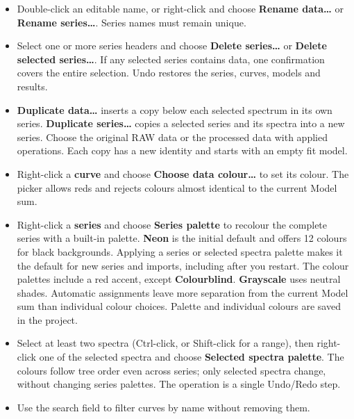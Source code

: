\documentclass[
  10pt,
  a4paper,
  oneside]{scrreprt}
\begin{document}
\begin{itemize}
  Waterfall displays. The equally sized coloured square beside the
  checkbox shows that spectrum's current colour (a native tree icon,
  beside the checkbox). Click the colour square to open the spectrum
  colour picker directly; this is separate from the visibility checkbox
  and supports Undo/Redo. The square also updates when colours or
  palettes change. Hover over the checkbox for an explanation. Hiding a
  spectrum retains its data and fit; hidden spectra are excluded from
  fit plans. Highlighting rows separately selects spectra for
  operations. Hidden spectrum names appear muted; Up/Down navigation
  skips them. Click a hidden spectrum to inspect it, or check its
  visibility box to include it in navigation again.
\item
  Double-click an editable name, or right-click and choose
  \textbf{Rename data\ldots{}} or \textbf{Rename series\ldots{}}. Series
  names must remain unique.
\item
  Select one or more series headers and choose \textbf{Delete
  series\ldots{}} or \textbf{Delete selected series\ldots{}}. If any
  selected series contains data, one confirmation covers the entire
  selection. Undo restores the series, curves, models and results.
\item
  \textbf{Duplicate data\ldots{}} inserts a copy below each selected
  spectrum in its own series. \textbf{Duplicate series\ldots{}} copies a
  selected series and its spectra into a new series. Choose the original
  RAW data or the processed data with applied operations. Each copy has
  a new identity and starts with an empty fit model.
\item
  Right-click a \textbf{curve} and choose \textbf{Choose data
  colour\ldots{}} to set its colour. The picker allows reds and rejects
  colours almost identical to the current Model sum.
\item
  Right-click a \textbf{series} and choose \textbf{Series palette} to
  recolour the complete series with a built-in palette. \textbf{Neon} is
  the initial default and offers 12 colours for black backgrounds.
  Applying a series or selected spectra palette makes it the default for
  new series and imports, including after you restart. The colour
  palettes include a red accent, except \textbf{Colourblind}.
  \textbf{Grayscale} uses neutral shades. Automatic assignments leave
  more separation from the current Model sum than individual colour
  choices. Palette and individual colours are saved in the project.
\item
  Select at least two spectra (Ctrl-click, or Shift-click for a range),
  then right-click one of the selected spectra and choose
  \textbf{Selected spectra palette}. The colours follow tree order even
  across series; only selected spectra change, without changing series
  palettes. The operation is a single Undo/Redo step.
\item
  Use the search field to filter curves by name without removing them.
\end{itemize}
\end{document}
